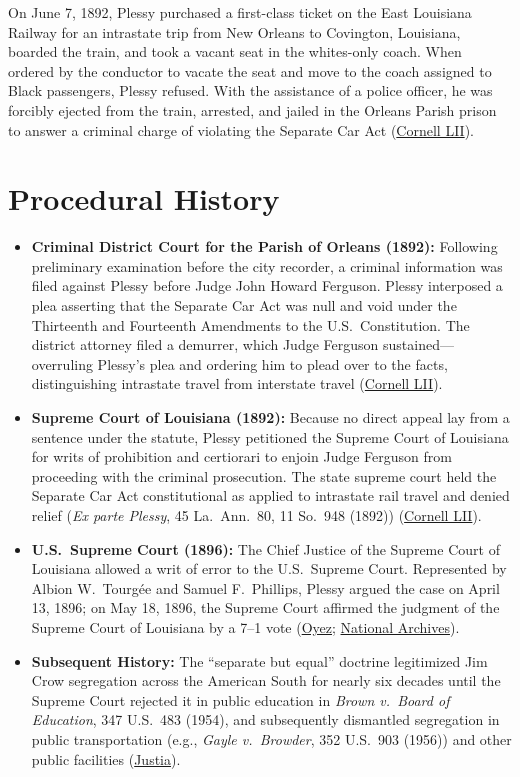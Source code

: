 \documentclass[12pt]{article}
\begin{document}
On June 7, 1892, Plessy purchased a first-class ticket on the East Louisiana Railway for an intrastate trip from New Orleans to Covington, Louisiana, boarded the train, and took a vacant seat in the whites-only coach. When ordered by the conductor to vacate the seat and move to the coach assigned to Black passengers, Plessy refused. With the assistance of a police officer, he was forcibly ejected from the train, arrested, and jailed in the Orleans Parish prison to answer a criminal charge of violating the Separate Car Act (\href{https://www.law.cornell.edu/supremecourt/text/163/537}{Cornell LII}).

\section{Procedural History}

\begin{itemize}
\item \textbf{Criminal District Court for the Parish of Orleans (1892):} Following preliminary examination before the city recorder, a criminal information was filed against Plessy before Judge John Howard Ferguson. Plessy interposed a plea asserting that the Separate Car Act was null and void under the Thirteenth and Fourteenth Amendments to the U.S.\ Constitution. The district attorney filed a demurrer, which Judge Ferguson sustained---overruling Plessy's plea and ordering him to plead over to the facts, distinguishing intrastate travel from interstate travel (\href{https://www.law.cornell.edu/supremecourt/text/163/537}{Cornell LII}).
\item \textbf{Supreme Court of Louisiana (1892):} Because no direct appeal lay from a sentence under the statute, Plessy petitioned the Supreme Court of Louisiana for writs of prohibition and certiorari to enjoin Judge Ferguson from proceeding with the criminal prosecution. The state supreme court held the Separate Car Act constitutional as applied to intrastate rail travel and denied relief (\textit{Ex parte Plessy}, 45 La.\ Ann.\ 80, 11 So.\ 948 (1892)) (\href{https://www.law.cornell.edu/supremecourt/text/163/537}{Cornell LII}).
\item \textbf{U.S.\ Supreme Court (1896):} The Chief Justice of the Supreme Court of Louisiana allowed a writ of error to the U.S.\ Supreme Court. Represented by Albion W.\ Tourg\'ee and Samuel F.\ Phillips, Plessy argued the case on April 13, 1896; on May 18, 1896, the Supreme Court affirmed the judgment of the Supreme Court of Louisiana by a 7--1 vote (\href{https://www.oyez.org/cases/1850-1900/163us537}{Oyez}; \href{https://www.archives.gov/milestone-documents/plessy-v-ferguson}{National Archives}).
\item \textbf{Subsequent History:} The ``separate but equal'' doctrine legitimized Jim Crow segregation across the American South for nearly six decades until the Supreme Court rejected it in public education in \textit{Brown v.\ Board of Education}, 347 U.S.\ 483 (1954), and subsequently dismantled segregation in public transportation (e.g., \textit{Gayle v.\ Browder}, 352 U.S.\ 903 (1956)) and other public facilities (\href{https://supreme.justia.com/cases/federal/us/163/537/}{Justia}).
\end{itemize}
\end{document}
